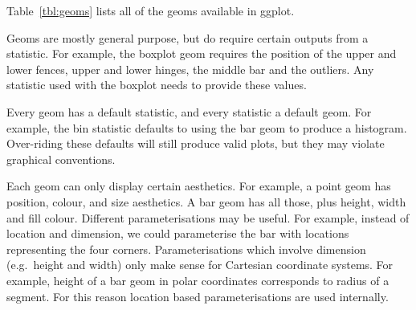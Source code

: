 Table~\ref{tbl:geoms} lists all of the geoms available in ggplot.  

Geoms are mostly general purpose, but do require certain outputs from a statistic.  For example, the boxplot geom requires the position of the upper and lower fences, upper and lower hinges, the middle bar and the outliers. Any statistic used with the boxplot needs to provide these values. 

Every geom has a default statistic, and every statistic a default geom.  For example, the bin statistic defaults to using the bar geom to produce a histogram.  Over-riding these defaults will still produce valid plots, but they may violate graphical conventions.

Each geom can only display certain aesthetics.  For example, a point geom has position, colour, and size aesthetics.  A bar geom has all those, plus height, width and fill colour.  Different parameterisations may be useful.  For example, instead of location and dimension, we could parameterise the bar with locations representing the four corners.  Parameterisations which involve dimension (e.g.\ height and width) only make sense for Cartesian coordinate systems.  For example, height of a bar geom in polar coordinates corresponds to radius of a segment.  For this reason location based parameterisations are used internally.  

